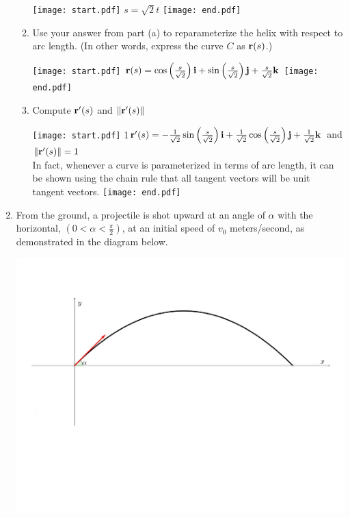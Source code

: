 \documentclass[12pt]{article}
\begin{document}
\begin{enumerate}
\begin{enumerate}
\texttt{[image: start.pdf]}
{{$s=\sqrt{2}t$}}
\texttt{[image: end.pdf]}


\item Use your answer from part (a) to reparameterize the helix with respect to arc length. (In other words, express the curve $C$ as ${\bf r}(s)$.)

\texttt{[image: start.pdf]}
{{${\bf r}(s)=\cos\left(\frac{s}{\sqrt{2}}\right){\bf i}+\sin\left(\frac{s}{\sqrt{2}}\right){\bf j}+\frac{s}{\sqrt{2}}{\bf k}$}}
\texttt{[image: end.pdf]}


\item Compute ${\bf r}^{\prime}(s)$ and $\|{\bf r}^{\prime}(s)\|$

\texttt{[image: start.pdf]}
{{{1\linewidth}{${\bf r}^{\prime}(s)=-\frac{1}{\sqrt{2}}\sin\left(\frac{s}{\sqrt{2}}\right){\bf i}+\frac{1}{\sqrt{2}}\cos\left(\frac{s}{\sqrt{2}}\right){\bf j}+\frac{1}{\sqrt{2}}{\bf k}$ and $\|{\bf r}^{\prime}(s)\|=1$\\
In fact, whenever a curve is parameterized in terms of arc length, it can be shown using the chain rule that all tangent vectors will be unit tangent vectors.
}}}
\texttt{[image: end.pdf]}


\end{enumerate}

\newpage

\item From the ground, a projectile is shot upward at an angle of $\alpha$ with the horizontal, $\left(0<\alpha<\frac{\pi}{2}\right)$, at an initial speed of $v_0$ meters/second, as demonstrated in the diagram below.

\begin{center}
\includegraphics[scale=0.5]{projectile.pdf}
\end{center}


\end{enumerate}
\end{document}
